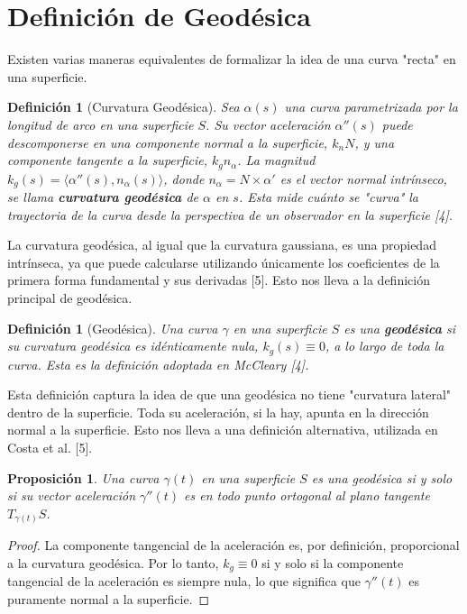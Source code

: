 \documentclass[12pt, a4paper]{report}
\theoremstyle{miestilo}
\newtheorem{proposicion}[teorema]{Proposición}
\theoremstyle{midefinicion}
\newtheorem{definicion}[teorema]{Definición}
\begin{document}
\section{Definición de Geodésica}

Existen varias maneras equivalentes de formalizar la idea de una curva "recta" en una superficie.

\begin{definicion}[Curvatura Geodésica]
Sea $\alpha(s)$ una curva parametrizada por la longitud de arco en una superficie $S$. Su vector aceleración $\alpha''(s)$ puede descomponerse en una componente normal a la superficie, $k_n N$, y una componente tangente a la superficie, $k_g n_\alpha$. La magnitud $k_g(s) = \langle \alpha''(s), n_\alpha(s) \rangle$, donde $n_\alpha = N \times \alpha'$ es el vector normal intrínseco, se llama \textbf{curvatura geodésica} de $\alpha$ en $s$. Esta mide cuánto se "curva" la trayectoria de la curva desde la perspectiva de un observador en la superficie [4].
\end{definicion}

La curvatura geodésica, al igual que la curvatura gaussiana, es una propiedad intrínseca, ya que puede calcularse utilizando únicamente los coeficientes de la primera forma fundamental y sus derivadas [5]. Esto nos lleva a la definición principal de geodésica.

\begin{definicion}[Geodésica]
Una curva $\gamma$ en una superficie $S$ es una \textbf{geodésica} si su curvatura geodésica es idénticamente nula, $k_g(s) \equiv 0$, a lo largo de toda la curva. Esta es la definición adoptada en McCleary [4].
\end{definicion}

Esta definición captura la idea de que una geodésica no tiene "curvatura lateral" dentro de la superficie. Toda su aceleración, si la hay, apunta en la dirección normal a la superficie. Esto nos lleva a una definición alternativa, utilizada en Costa et al. [5].

\begin{proposicion}
Una curva $\gamma(t)$ en una superficie $S$ es una geodésica si y solo si su vector aceleración $\gamma''(t)$ es en todo punto ortogonal al plano tangente $T_{\gamma(t)}S$.
\end{proposicion}

\begin{proof}
La componente tangencial de la aceleración es, por definición, proporcional a la curvatura geodésica. Por lo tanto, $k_g \equiv 0$ si y solo si la componente tangencial de la aceleración es siempre nula, lo que significa que $\gamma''(t)$ es puramente normal a la superficie.
\end{proof}
\end{document}
